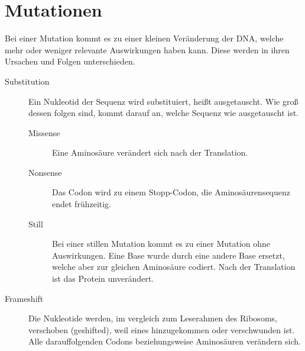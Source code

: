 \documentclass{article}
\begin{document}
\section{Mutationen} 
Bei einer Mutation kommt es zu einer kleinen Veränderung der DNA, welche mehr oder weniger relevante Auswirkungen haben kann.
Diese werden in ihren Ursachen und Folgen unterschieden.
\begin{description}
 \item[Substitution] Ein Nukleotid der Sequenz wird substituiert, heißt ausgetauscht. Wie groß dessen folgen sind, kommt darauf an, welche Sequenz wie ausgetauscht ist.
  \begin{description}
   \item[Missense] Eine Aminosäure verändert sich nach der Translation. 
   \item[Nonsense] Das Codon wird zu einem Stopp-Codon, die Aminosäurensequenz endet frühzeitig. 
   \item[Still] Bei einer stillen Mutation kommt es zu einer Mutation ohne Auswirkungen. Eine Base wurde durch eine andere Base ersetzt, welche aber zur gleichen Aminosäure codiert. Nach der Translation ist das Protein unverändert.
  \end{description} 
 \item[Frameshift] Die Nukleotide werden, im vergleich zum Leserahmen des Ribosoms, verschoben (geshifted), weil eines hinzugekommen oder verschwunden ist. Alle darauffolgenden Codons beziehungsweise Aminosäuren verändern sich.
\end{description} 
\end{document}
